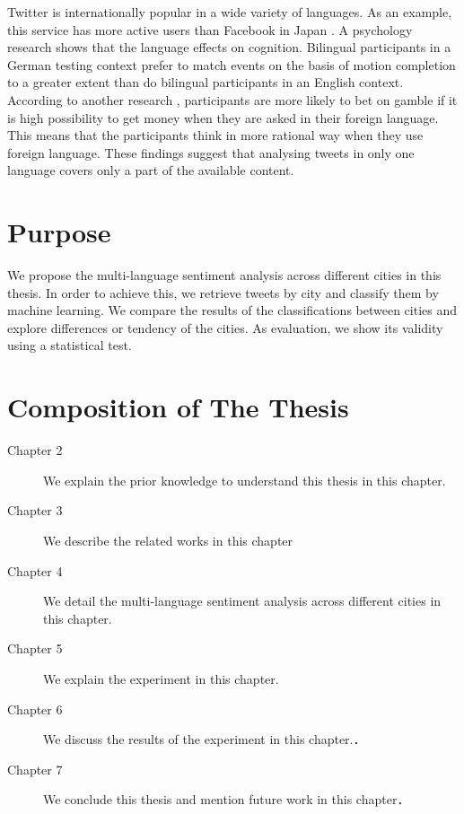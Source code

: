 Twitter is internationally popular in a wide variety of languages.
As an example, this service has more active users than Facebook in Japan \cite{japan_twitter}.
A psychology research \cite{psychology1} shows that the language effects on cognition.
Bilingual participants in a German testing context prefer to match events on the basis of motion completion to a greater extent than do bilingual participants in an English context.
According to another research \cite{psychology2}, participants are more likely to bet on gamble if it is high possibility to get money when they are asked in their foreign language.
This means that the participants think in more rational way when they use foreign language.
These findings suggest that analysing tweets in only one language covers only a part of the available content.

\section{Purpose}
We propose the multi-language sentiment analysis across different cities in this thesis.
In order to achieve this, we retrieve tweets by city and classify them by machine learning. 
We compare the results of the classifications between cities and explore differences or tendency of the cities. 
As evaluation, we show its validity using a statistical test.

\section{Composition of The Thesis}

\begin{description}
 \item[Chapter 2] We explain the prior knowledge to understand this thesis in this chapter.
 \item[Chapter 3] We describe the related works in this chapter
 \item[Chapter 4] We detail the multi-language sentiment analysis across different cities in this chapter.
 \item[Chapter 5] We explain the experiment in this chapter.
 \item[Chapter 6] We discuss the results of the experiment in this chapter.．
 \item[Chapter 7] We conclude this thesis and mention future work in this chapter．
\end{description}

